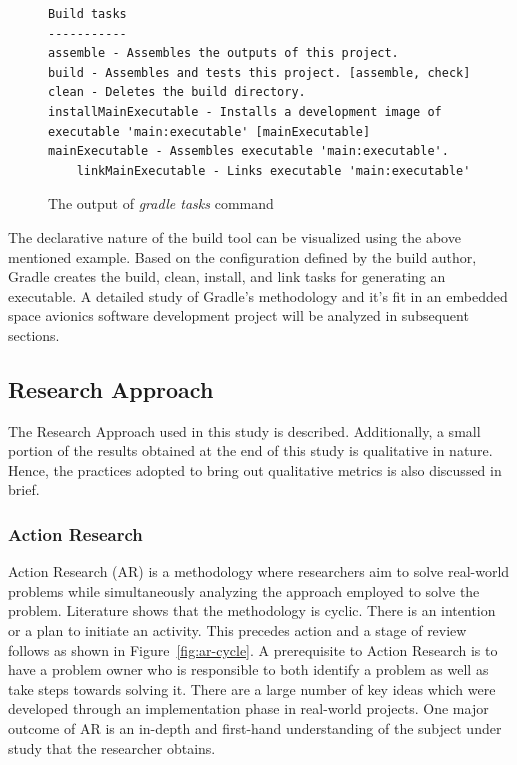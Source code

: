 \documentclass[12pt, a4paper, titlepage]{scrartcl}
\newcommand{\courierword}[1]{\textsf{\itshape #1}}{\fontfamily{pcr}\selectfont}%
\begin{document}
\begin{figure}[!ht]
\begin{lstlisting}[frame=single]
Build tasks
-----------
assemble - Assembles the outputs of this project.
build - Assembles and tests this project. [assemble, check]
clean - Deletes the build directory.
installMainExecutable - Installs a development image of executable 'main:executable' [mainExecutable]
mainExecutable - Assembles executable 'main:executable'.
    linkMainExecutable - Links executable 'main:executable'
\end{lstlisting}
\caption{The output of \courierword{gradle tasks} command}
\label{fig:example-task-gradle}
\end{figure}
\par The declarative nature of the build tool can be visualized using the above mentioned example. Based on the configuration defined by the build author, Gradle creates the build, clean, install, and link tasks for generating an executable. A detailed study of Gradle's methodology and it's fit in an embedded space avionics software development project will be analyzed in subsequent sections. 

\subsection{Research Approach}
\par The Research Approach used in this study is described. Additionally, a small portion of the results obtained at the end of this study is qualitative in nature. Hence, the practices adopted to bring out qualitative metrics is also discussed in brief. 
\subsubsection{Action Research}
\par Action Research (AR) is a methodology where researchers aim to solve real-world problems while simultaneously analyzing the approach employed to solve the problem\cite{easterbrook2008selecting}. Literature shows that the methodology is cyclic\cite{dick2010action}. There is an intention or a plan to initiate an activity. This precedes action and a stage of review follows as shown in Figure~\ref{fig:ar-cycle}. A prerequisite to Action Research is to have a problem owner who is responsible to both identify a problem as well as take steps towards solving it. There are a large number of key ideas which were developed through an implementation phase in real-world projects\cite{greenwood2006introduction}. One major outcome of AR is an in-depth and first-hand understanding of the subject under study that the researcher obtains\cite{sjoberg2007future}.
\end{document}
